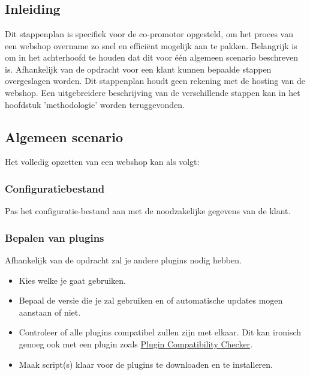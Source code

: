 
\chapter{}%
\label{ch:stappenplan}

\section{Inleiding}
Dit stappenplan is specifiek voor de co-promotor opgesteld, om het proces van een webshop overname zo snel en efficiënt mogelijk aan te pakken. Belangrijk is om in het achterhoofd te houden dat dit voor één algemeen scenario beschreven is. Afhankelijk van de opdracht voor een klant kunnen bepaalde stappen overgeslagen worden. Dit stappenplan houdt geen rekening met de hosting van de webshop. Een uitgebreidere beschrijving van de verschillende stappen kan in het hoofdstuk 'methodologie' worden teruggevonden.  

\section{Algemeen scenario}
Het volledig opzetten van een webshop kan als volgt:
\subsection{Configuratiebestand}
Pas het configuratie-bestand aan met de noodzakelijke gegevens van de klant.
\subsection{Bepalen van plugins}
Afhankelijk van de opdracht zal je andere plugins nodig hebben.
\begin{itemize}
    \item Kies welke je gaat gebruiken. 
    \item Bepaal de versie die je zal gebruiken en of automatische updates mogen aanstaan of niet.
    \item Controleer of alle plugins compatibel zullen zijn met elkaar. Dit kan ironisch genoeg ook met een plugin zoals \href{https://wordpress.org/plugins/plugin-compatibility-checker/}{Plugin Compatibility Checker}.
    \item Maak script(s) klaar voor de plugins te downloaden en te installeren.
\end{itemize}
